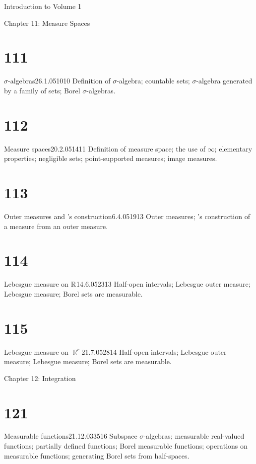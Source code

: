 Introduction to Volume 1 

\medskip

Chapter 11:  Measure Spaces


\section{111}{$\sigma$-algebras}{26.1.05}{10}{10}
{Definition of $\sigma$-algebra;  countable sets;
$\sigma$-algebra generated by a family of sets;  Borel 
$\sigma$-algebras.}

\section{112}{Measure spaces}{20.2.05}{14}{11}
{Definition of measure space;  the use of $\infty$;  elementary
properties;  negligible sets;  point-supported
measures;  image measures.}

\section{113}{Outer measures and \Caratheodory's
construction}{6.4.05}{19}{13}
{Outer measures;  \Caratheodory's construction of a measure from
an outer measure.}

\section{114}{Lebesgue measure on $\Bbb{R}$}{14.6.05}{23}{13}
{Half-open intervals;  Lebesgue outer measure;  Lebesgue measure;
Borel sets are measurable.}

\section{115}{Lebesgue measure on $\BbbR^r$}{21.7.05}{28}{14}
{Half-open intervals;  Lebesgue outer measure;  Lebesgue measure;
Borel sets are measurable.}

\medskip

 Chapter 12:  Integration


\section{121}{Measurable functions}{21.12.03}{35}{16}
{Subspace $\sigma$-algebras;  measurable real-valued functions;
partially defined functions;  Borel measurable functions;  operations on
measurable functions;  generating Borel sets from half-spaces.}


